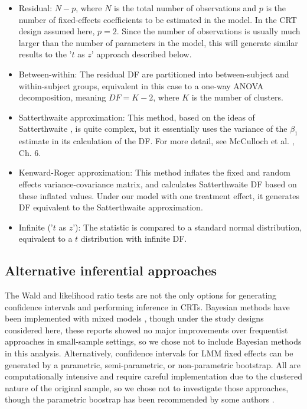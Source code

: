 \documentclass[twocolumn]{bmcart}%
\begin{document}
\begin{itemize}
  \item Residual: $N - p$, where $N$ is the total number of observations and $p$ is the number of fixed-effects coefficients to be estimated in the model. In the CRT design assumed here, $p=2$. Since the number of observations is usually much larger than the number of parameters in the model, this will generate similar results to the '$t$ as $z$' approach described below.
  \item Between-within: The residual DF are partitioned into between-subject and within-subject groups, equivalent in this case to a one-way ANOVA decomposition, meaning $DF = K-2$, where $K$ is the number of clusters.
  \item Satterthwaite approximation: This method, based on the ideas of Satterthwaite \cite{satterthwaite_approximate_1946}, is quite complex, but it essentially uses the variance of the $\beta_1$ estimate in its calculation of the DF. For more detail, see McCulloch et al. \cite{mcculloch_generalized_2008}, Ch. 6.
  \item Kenward-Roger approximation: This method \cite{kenward_small_1997} inflates the fixed and random effects variance-covariance matrix, and calculates Satterthwaite DF based on these inflated values. Under our model with one treatment effect, it generates DF equivalent to the Satterthwaite approximation.
  \item Infinite ('$t$ as $z$'): The statistic is compared to a standard normal distribution, equivalent to a $t$ distribution with infinite DF.
\end{itemize}

\subsection*{Alternative inferential approaches}

The Wald and likelihood ratio tests are not the only options for generating confidence intervals and performing inference in CRTs. Bayesian methods have been implemented with mixed models \cite{browne_comparison_2006, baldwin_bayesian_2013}, though under the study designs considered here, these reports showed no major improvements over frequentist approaches in small-sample settings, so we chose not to include Bayesian methods in this analysis. Alternatively, confidence intervals for LMM fixed effects can be generated by a parametric, semi-parametric, or non-parametric bootstrap. All are computationally intensive and require careful implementation due to the clustered nature of the original sample, so we chose not to investigate those approaches, though the parametric boostrap has been recommended by some authors \cite{ukyo_improved_2019}.
\end{document}

